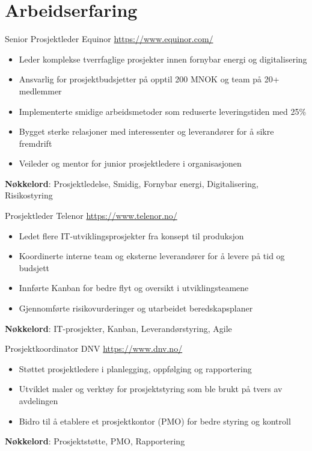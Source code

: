 \documentclass[a4paper, serif, 10pt]{moderncv}
\begin{document}
\section{Arbeidserfaring}

        {Senior Prosjektleder}
        {Equinor}
        {\url{https://www.equinor.com/}}
        {}
        {\begin{itemize}
\item Leder komplekse tverrfaglige prosjekter innen fornybar energi og digitalisering
\item Ansvarlig for prosjektbudsjetter på opptil 200 MNOK og team på 20+ medlemmer
\item Implementerte smidige arbeidsmetoder som reduserte leveringstiden med 25\%
\item Bygget sterke relasjoner med interessenter og leverandører for å sikre fremdrift
\item Veileder og mentor for junior prosjektledere i organisasjonen
\end{itemize}
\textbf{Nøkkelord}: Prosjektledelse, Smidig, Fornybar energi, Digitalisering, Risikostyring}

        {Prosjektleder}
        {Telenor}
        {\url{https://www.telenor.no/}}
        {}
        {\begin{itemize}
\item Ledet flere IT-utviklingsprosjekter fra konsept til produksjon
\item Koordinerte interne team og eksterne leverandører for å levere på tid og budsjett
\item Innførte Kanban for bedre flyt og oversikt i utviklingsteamene
\item Gjennomførte risikovurderinger og utarbeidet beredskapsplaner
\end{itemize}
\textbf{Nøkkelord}: IT-prosjekter, Kanban, Leverandørstyring, Agile}

        {Prosjektkoordinator}
        {DNV}
        {\url{https://www.dnv.no/}}
        {}
        {\begin{itemize}
\item Støttet prosjektledere i planlegging, oppfølging og rapportering
\item Utviklet maler og verktøy for prosjektstyring som ble brukt på tvers av avdelingen
\item Bidro til å etablere et prosjektkontor (PMO) for bedre styring og kontroll
\end{itemize}
\textbf{Nøkkelord}: Prosjektstøtte, PMO, Rapportering}
\end{document}
